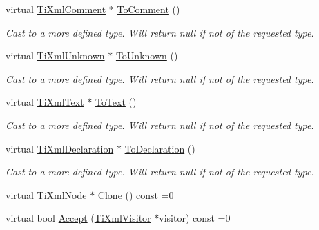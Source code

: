 \begin{DoxyCompactItemize}
\hypertarget{class_ti_xml_node_a383e06a0787f7063953934867990f849}{}\label{class_ti_xml_node_a383e06a0787f7063953934867990f849} 
virtual \hyperlink{class_ti_xml_comment}{Ti\+Xml\+Comment} $\ast$ \hyperlink{class_ti_xml_node_a383e06a0787f7063953934867990f849}{To\+Comment} ()
\begin{DoxyCompactList}\small\item\em Cast to a more defined type. Will return null if not of the requested type. \end{DoxyCompactList}\item 
\hypertarget{class_ti_xml_node_a06de5af852668c7e4af0d09c205f0b0d}{}\label{class_ti_xml_node_a06de5af852668c7e4af0d09c205f0b0d} 
virtual \hyperlink{class_ti_xml_unknown}{Ti\+Xml\+Unknown} $\ast$ \hyperlink{class_ti_xml_node_a06de5af852668c7e4af0d09c205f0b0d}{To\+Unknown} ()
\begin{DoxyCompactList}\small\item\em Cast to a more defined type. Will return null if not of the requested type. \end{DoxyCompactList}\item 
\hypertarget{class_ti_xml_node_a3ddfbcac78fbea041fad57e5c6d60a03}{}\label{class_ti_xml_node_a3ddfbcac78fbea041fad57e5c6d60a03} 
virtual \hyperlink{class_ti_xml_text}{Ti\+Xml\+Text} $\ast$ \hyperlink{class_ti_xml_node_a3ddfbcac78fbea041fad57e5c6d60a03}{To\+Text} ()
\begin{DoxyCompactList}\small\item\em Cast to a more defined type. Will return null if not of the requested type. \end{DoxyCompactList}\item 
\hypertarget{class_ti_xml_node_a4027136ca820ff4a636b607231b6a6df}{}\label{class_ti_xml_node_a4027136ca820ff4a636b607231b6a6df} 
virtual \hyperlink{class_ti_xml_declaration}{Ti\+Xml\+Declaration} $\ast$ \hyperlink{class_ti_xml_node_a4027136ca820ff4a636b607231b6a6df}{To\+Declaration} ()
\begin{DoxyCompactList}\small\item\em Cast to a more defined type. Will return null if not of the requested type. \end{DoxyCompactList}\item 
virtual \hyperlink{class_ti_xml_node}{Ti\+Xml\+Node} $\ast$ \hyperlink{class_ti_xml_node_a4508cc3a2d7a98e96a54cc09c37a78a4}{Clone} () const =0
\item 
virtual bool \hyperlink{class_ti_xml_node_acc0f88b7462c6cb73809d410a4f5bb86}{Accept} (\hyperlink{class_ti_xml_visitor}{Ti\+Xml\+Visitor} $\ast$visitor) const =0
\end{DoxyCompactItemize}
